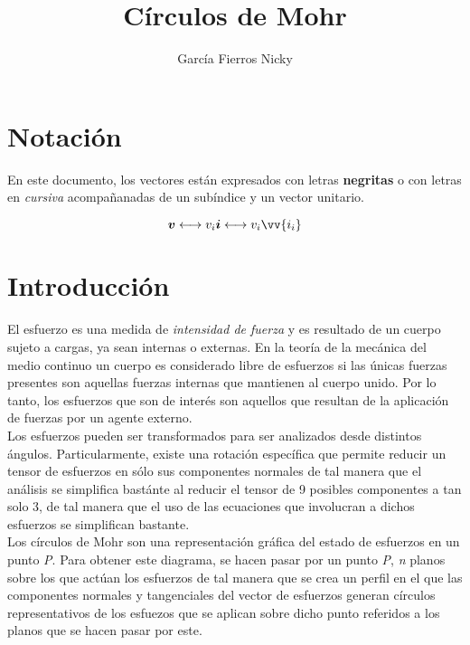 \documentclass{article}
\title{Círculos de Mohr}
\author{García Fierros Nicky}
\begin{document}
    \maketitle
    \newpage
    
    \tableofcontents
    \newpage

    \section{Notación}

    En este documento, los vectores están expresados con letras \textbf{negritas} o con
    letras en \textit{cursiva} acompañanadas de un subíndice y un vector unitario.

    \begin{equation*}
        \bm{v} \longleftrightarrow v_{i}\bm{i} \longleftrightarrow v_{i}\vv{i_{i}}
    \end{equation*}

    \newpage

    \section{Introducción}

    El esfuerzo es una medida de \textit{intensidad de fuerza} y es resultado de un 
    cuerpo sujeto a cargas, ya sean internas o externas. En la teoría de la mecánica
    del medio continuo un cuerpo es considerado libre de esfuerzos si las únicas
    fuerzas presentes son aquellas fuerzas internas que mantienen al cuerpo unido.
    Por lo tanto, los esfuerzos que son de interés son aquellos que resultan de la
    aplicación de fuerzas por un agente externo.\\

    Los esfuerzos pueden ser transformados para ser analizados desde distintos ángulos.
    Particularmente, existe una rotación específica que permite reducir un tensor de
    esfuerzos en sólo sus componentes normales de tal manera que el análisis se
    simplifica bastánte al reducir el tensor de 9 posibles componentes a tan solo 3, de
    tal manera que el uso de las ecuaciones que involucran a dichos esfuerzos se
    simplifican bastante.\\
    
    Los círculos de Mohr son una representación gráfica del estado de esfuerzos en un punto 
    \textit{P}. Para obtener este diagrama, se hacen pasar por un punto \textit{P}, 
    \textit{n} planos \bm{$\eta$} sobre los que actúan los esfuerzos de tal manera que se 
    crea un perfil en el que las componentes normales y tangenciales del vector de esfuerzos 
     generan círculos representativos de los esfuezos que se aplican sobre 
    dicho punto referidos a los planos \bm{$\eta$} que se hacen pasar por este.\\
\end{document}
